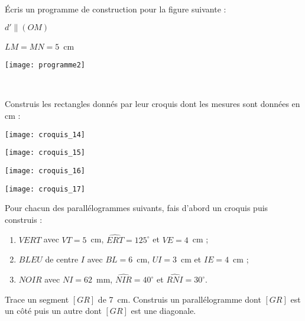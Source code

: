\begin{exercice}
Écris un programme de construction pour la figure suivante :

\begin{minipage}[c]{0.46\linewidth}
$d' \parallel (OM)$

$LM = MN = 5$ cm
 \end{minipage} \hfill%
 \begin{minipage}[c]{0.46\linewidth}
  \texttt{[image: programme2]}
  \end{minipage} \\
\end{exercice}


\begin{exercice}
Construis les rectangles donnés par leur croquis dont les mesures sont données en cm :
\begin{colenumerate}{2}
 \item
 
 \texttt{[image: croquis\_14]}
  \item
 
 \texttt{[image: croquis\_15]}
  \item
 
 \texttt{[image: croquis\_16]}
  \item
 
 \texttt{[image: croquis\_17]}
 \end{colenumerate}
\end{exercice}


\begin{exercice}
Pour chacun des parallélogrammes suivants, fais d’abord un croquis puis construis :
\begin{enumerate}
 \item $VERT$ avec $VT = 5$ cm, $\widehat{ERT} = 125^\circ$ et $VE = 4$ cm ;
 \item $BLEU$ de centre $I$ avec $BL = 6$ cm, $UI = 3$ cm et $IE = 4$ cm ;
 \item $NOIR$ avec $NI = 62$ mm, $\widehat{NIR} = 40^\circ$ et $\widehat{RNI} = 30^\circ$.  
 \end{enumerate}
\end{exercice}


\begin{exercice}
Trace un segment $[GR]$ de 7 cm. Construis un parallélogramme dont $[GR]$ est un côté puis un autre dont $[GR]$ est une diagonale.
\end{exercice}


